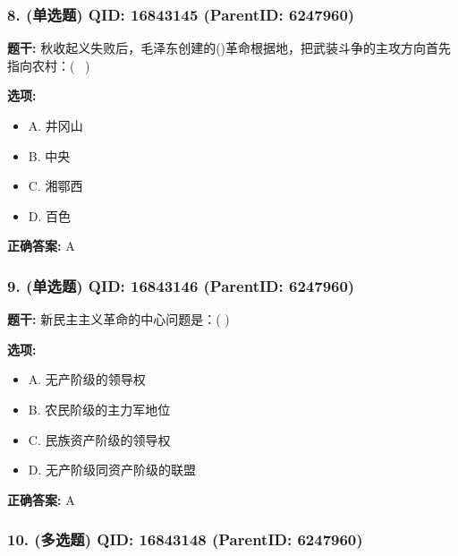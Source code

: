 \documentclass[12pt,UTF8]{ctexart}
\begin{document}
\subsubsection*{8. (单选题) \small QID: 16843145 (ParentID: 6247960)}

\textbf{题干:}
秋收起义失败后，毛泽东创建的()革命根据地，把武装斗争的主攻方向首先指向农村：(  )



\textbf{选项:}
\begin{itemize}[leftmargin=*]

  \item A. 井冈山

  \item B. 中央

  \item C. 湘鄂西

  \item D. 百色

\end{itemize}

\textbf{正确答案:}
A

\vspace{0.3em}\hrulefill\vspace{0.7em}

\subsubsection*{9. (单选题) \small QID: 16843146 (ParentID: 6247960)}

\textbf{题干:}
新民主主义革命的中心问题是：( )



\textbf{选项:}
\begin{itemize}[leftmargin=*]

  \item A. 无产阶级的领导权

  \item B. 农民阶级的主力军地位

  \item C. 民族资产阶级的领导权

  \item D. 无产阶级同资产阶级的联盟

\end{itemize}

\textbf{正确答案:}
A

\vspace{0.3em}\hrulefill\vspace{0.7em}

\subsubsection*{10. (多选题) \small QID: 16843148 (ParentID: 6247960)}
\end{document}
